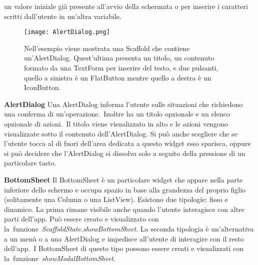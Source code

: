\begin{trivlist}
		un valore iniziale già presente all'avvio della schermata o per inserire
		i caratteri scritti dall'utente in un'altra variabile.
		\begin{figure}
			\centering
			\texttt{[image: AlertDialog.png]}			
			\caption{Nell'esempio viene mostrata una Scaffold che contiene
			un'AlertDialog. Quest'ultima presenta un titolo, un contenuto
			formato da una TextForm per inserire del testo, e due pulsanti,
			quello a sinistra è un FlatButton mentre quello a destra è un IconButton.}
		\end{figure}
		\item \textbf{AlertDialog} \newline
		Una AlertDialog informa l'utente sulle situazioni che richiedono una
		conferma di un'operazione. Inoltre ha un titolo opzionale e un
		elenco opzionale di azioni. Il titolo viene visualizzato in alto e le
		azioni vengono visualizzate sotto il contenuto dell’AlertDialog. Si può
		anche scegliere che se l'utente tocca al di fuori dell'area dedicata a
		questo widget esso sparisca, oppure si può decidere che l'AlertDialog si
		dissolva solo a seguito della pressione di un particolare tasto.
		\item \textbf{BottomSheet} \newline
		Il BottomSheet è un particolare widget che appare nella parte inferiore
		dello schermo e occupa spazio in base alla grandezza del proprio figlio
		(solitamente una Column o una ListView). Esistono due tipologie: fisso e
		dinamico. La prima rimane visibile anche quando l'utente interagisce con
		altre parti dell'app. Può essere creato e visualizzato  con
		la funzione \textit{ScaffoldState.showBottomSheet}. La seconda tipologia
		è un'alternativa a un menù o a una AlertDialog e impedisce all'utente di
		interagire con il resto dell'app. I BottomSheet di questo tipo possono
		essere creati e visualizzati con
		la funzione \textit{showModalBottomSheet}.
	\end{trivlist}

